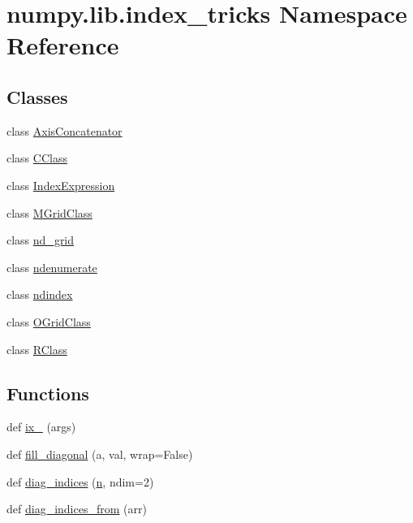\hypertarget{namespacenumpy_1_1lib_1_1index__tricks}{}\section{numpy.\+lib.\+index\+\_\+tricks Namespace Reference}
\label{namespacenumpy_1_1lib_1_1index__tricks}
\subsection*{Classes}
\begin{DoxyCompactItemize}
\item 
class \hyperlink{classnumpy_1_1lib_1_1index__tricks_1_1AxisConcatenator}{Axis\+Concatenator}
\item 
class \hyperlink{classnumpy_1_1lib_1_1index__tricks_1_1CClass}{C\+Class}
\item 
class \hyperlink{classnumpy_1_1lib_1_1index__tricks_1_1IndexExpression}{Index\+Expression}
\item 
class \hyperlink{classnumpy_1_1lib_1_1index__tricks_1_1MGridClass}{M\+Grid\+Class}
\item 
class \hyperlink{classnumpy_1_1lib_1_1index__tricks_1_1nd__grid}{nd\+\_\+grid}
\item 
class \hyperlink{classnumpy_1_1lib_1_1index__tricks_1_1ndenumerate}{ndenumerate}
\item 
class \hyperlink{classnumpy_1_1lib_1_1index__tricks_1_1ndindex}{ndindex}
\item 
class \hyperlink{classnumpy_1_1lib_1_1index__tricks_1_1OGridClass}{O\+Grid\+Class}
\item 
class \hyperlink{classnumpy_1_1lib_1_1index__tricks_1_1RClass}{R\+Class}
\end{DoxyCompactItemize}
\subsection*{Functions}
\begin{DoxyCompactItemize}
\item 
def \hyperlink{namespacenumpy_1_1lib_1_1index__tricks_ac7efd051779676e13d5806315e7aa940}{ix\+\_\+} (args)
\item 
def \hyperlink{namespacenumpy_1_1lib_1_1index__tricks_a63f9e685bbece785aff8007562d962fb}{fill\+\_\+diagonal} (a, val, wrap=False)
\item 
def \hyperlink{namespacenumpy_1_1lib_1_1index__tricks_a60c3ddca84d2352b753fd5e01a23e414}{diag\+\_\+indices} (\hyperlink{namespacenumpy_a352663c52853d2754274407d5cae2832}{n}, ndim=2)
\item 
def \hyperlink{namespacenumpy_1_1lib_1_1index__tricks_a62e2c1605b994480377db680e3707673}{diag\+\_\+indices\+\_\+from} (arr)
\end{DoxyCompactItemize}
